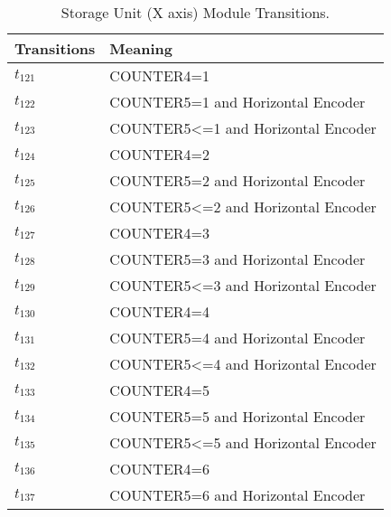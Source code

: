 \begin{table}[H]
\caption{Storage Unit (X axis) Module Transitions.}
\centering
\begin{tabular}{M{5cm}M{10cm}}
Transitions & Meaning\\
\hline
\hyperlink{partialNet:t1211}{\hypertarget{partialTable:t121}{$t_{121}$}} & COUNTER4=1\\
\hyperlink{partialNet:t1221}{\hypertarget{partialTable:t122}{$t_{122}$}} & COUNTER5=1 and Horizontal Encoder\\
\hyperlink{partialNet:t1231}{\hypertarget{partialTable:t123}{$t_{123}$}} & COUNTER5<=1 and Horizontal Encoder\\
\hyperlink{partialNet:t1241}{\hypertarget{partialTable:t124}{$t_{124}$}} & COUNTER4=2\\
\hyperlink{partialNet:t1251}{\hypertarget{partialTable:t125}{$t_{125}$}} & COUNTER5=2 and Horizontal Encoder\\
\hyperlink{partialNet:t1261}{\hypertarget{partialTable:t126}{$t_{126}$}} & COUNTER5<=2 and Horizontal Encoder\\
\hyperlink{partialNet:t1271}{\hypertarget{partialTable:t127}{$t_{127}$}} & COUNTER4=3\\
\hyperlink{partialNet:t1281}{\hypertarget{partialTable:t128}{$t_{128}$}} & COUNTER5=3 and Horizontal Encoder\\
\hyperlink{partialNet:t1291}{\hypertarget{partialTable:t129}{$t_{129}$}} & COUNTER5<=3 and Horizontal Encoder\\
\hyperlink{partialNet:t1301}{\hypertarget{partialTable:t130}{$t_{130}$}} & COUNTER4=4\\
\hyperlink{partialNet:t1311}{\hypertarget{partialTable:t131}{$t_{131}$}} & COUNTER5=4 and Horizontal Encoder\\
\hyperlink{partialNet:t1321}{\hypertarget{partialTable:t132}{$t_{132}$}} & COUNTER5<=4 and Horizontal Encoder\\
\hyperlink{partialNet:t1331}{\hypertarget{partialTable:t133}{$t_{133}$}} & COUNTER4=5\\
\hyperlink{partialNet:t1341}{\hypertarget{partialTable:t134}{$t_{134}$}} & COUNTER5=5 and Horizontal Encoder\\
\hyperlink{partialNet:t1351}{\hypertarget{partialTable:t135}{$t_{135}$}} & COUNTER5<=5 and Horizontal Encoder\\
\hyperlink{partialNet:t1361}{\hypertarget{partialTable:t136}{$t_{136}$}} & COUNTER4=6\\
\hyperlink{partialNet:t1371}{\hypertarget{partialTable:t137}{$t_{137}$}} & COUNTER5=6 and Horizontal Encoder\\

\end{tabular}
\end{table}
